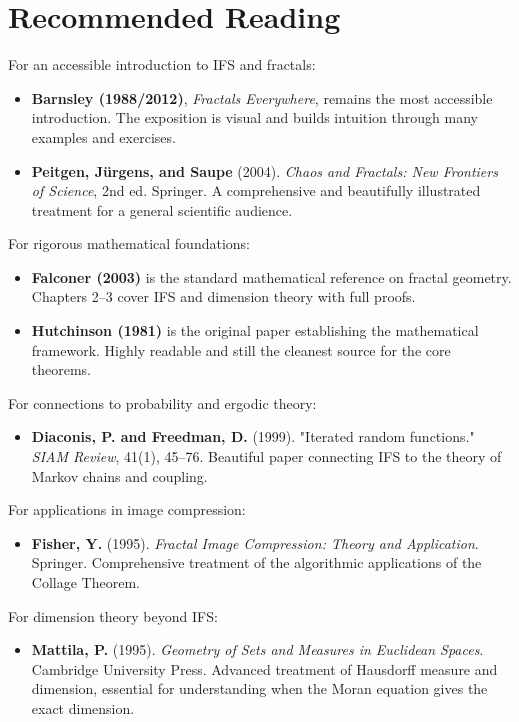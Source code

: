 \section{Recommended Reading}

For an accessible introduction to IFS and fractals:

\begin{itemize}
\item \textbf{Barnsley (1988/2012)}, \textit{Fractals Everywhere}, remains the most accessible introduction. The exposition is visual and builds intuition through many examples and exercises.
\end{itemize}

\begin{itemize}
\item \textbf{Peitgen, Jürgens, and Saupe} (2004). \textit{Chaos and Fractals: New Frontiers of Science}, 2nd ed. Springer. A comprehensive and beautifully illustrated treatment for a general scientific audience.
\end{itemize}

For rigorous mathematical foundations:

\begin{itemize}
\item \textbf{Falconer (2003)} is the standard mathematical reference on fractal geometry. Chapters 2--3 cover IFS and dimension theory with full proofs.
\end{itemize}

\begin{itemize}
\item \textbf{Hutchinson (1981)} is the original paper establishing the mathematical framework. Highly readable and still the cleanest source for the core theorems.
\end{itemize}

For connections to probability and ergodic theory:

\begin{itemize}
\item \textbf{Diaconis, P. and Freedman, D.} (1999). "Iterated random functions." \textit{SIAM Review}, 41(1), 45--76. Beautiful paper connecting IFS to the theory of Markov chains and coupling.
\end{itemize}

For applications in image compression:

\begin{itemize}
\item \textbf{Fisher, Y.} (1995). \textit{Fractal Image Compression: Theory and Application}. Springer. Comprehensive treatment of the algorithmic applications of the Collage Theorem.
\end{itemize}

For dimension theory beyond IFS:

\begin{itemize}
\item \textbf{Mattila, P.} (1995). \textit{Geometry of Sets and Measures in Euclidean Spaces}. Cambridge University Press. Advanced treatment of Hausdorff measure and dimension, essential for understanding when the Moran equation gives the exact dimension.
\end{itemize}
